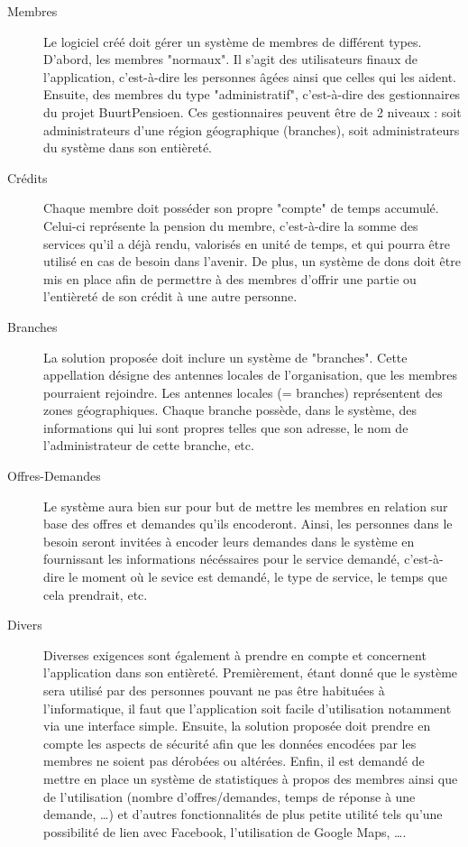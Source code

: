\begin{description}

\item [Membres]
Le logiciel créé doit gérer un système de membres de différent types.  D'abord,  les membres "normaux".  Il s'agit des utilisateurs finaux de l'application,  c'est-à-dire les personnes âgées ainsi que celles qui les aident.  Ensuite,  des membres du type "administratif",  c'est-à-dire des gestionnaires du projet BuurtPensioen.  Ces gestionnaires peuvent être de 2 niveaux : soit administrateurs d'une région géographique (branches),  soit administrateurs du système dans son entièreté.

\item [Crédits]
Chaque membre doit posséder son propre "compte" de temps accumulé.  Celui-ci représente la pension du membre,  c'est-à-dire la somme des services qu'il a déjà rendu,  valorisés en unité de temps,  et qui pourra être utilisé en cas de besoin dans l'avenir.  De plus,  un système de dons doit être mis en place afin de permettre à des membres d'offrir une partie ou l'entièreté de son crédit à une autre personne.

\item [Branches]
La solution proposée doit inclure un système de "branches".  Cette appellation désigne des antennes locales de l'organisation,  que les membres pourraient rejoindre.  Les antennes locales (= branches) représentent des zones géographiques.  
Chaque branche possède,  dans le système,  des informations qui lui sont propres telles que son adresse,  le nom de l'administrateur de cette branche,  etc.

\item [Offres-Demandes]
Le système aura bien sur pour but de mettre les membres en relation sur base des offres et demandes qu'ils encoderont.  Ainsi,  les personnes dans le besoin seront invitées à encoder leurs demandes dans le système en fournissant les informations nécéssaires pour le service demandé,  c'est-à-dire le moment où le sevice est demandé,  le type de service,  le temps que cela prendrait, etc.

\item [Divers]
Diverses exigences sont également à prendre en compte et concernent l'application dans son entièreté.  Premièrement,  étant donné que le système sera utilisé par des personnes pouvant ne pas être habituées à l'informatique,  il faut que l'application soit facile d'utilisation notamment via une interface simple.  Ensuite,  la solution proposée doit prendre en compte les aspects de sécurité afin que les données encodées par les membres ne soient pas dérobées ou altérées.  Enfin,  il est demandé de mettre en place un système de statistiques à propos des membres ainsi que de l'utilisation (nombre d'offres/demandes,  temps de réponse à une demande, \dots ) et d'autres fonctionnalités de plus petite utilité tels qu'une possibilité de lien avec Facebook,  l'utilisation de Google Maps, \dots .


\end{description}
